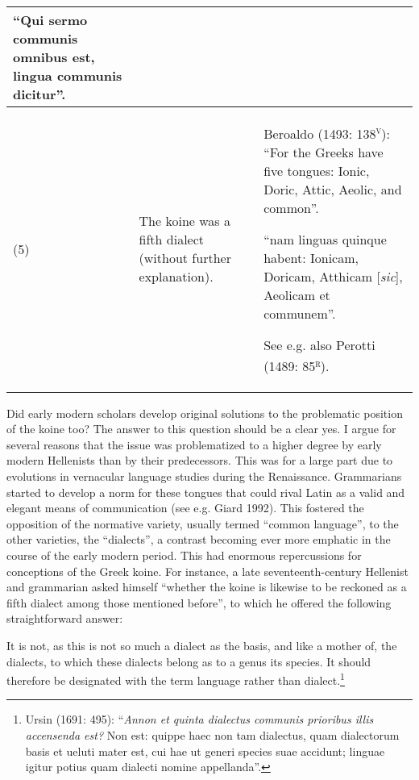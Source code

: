 \begin{flushleft}
\begin{supertabular}{|m{0.27685985in}|m{1.8261598in}|m{3.9538598in}|}
“Qui sermo communis omnibus est, lingua communis dicitur”.\\\hline
\centering (5) &
\centering The koine was a fifth dialect (without further explanation). &
Beroaldo (1493: 138\textsc{\textsuperscript{v}}): “For the Greeks have five tongues: Ionic, Doric, Attic, Aeolic, and common”.

“nam linguas quinque habent: Ionicam, Doricam, Atthicam [\textit{sic}], Aeolicam et communem”.

See e.g. also Perotti (1489: 85\textsc{\textsuperscript{r}}).\\\hline
\end{supertabular}
\end{flushleft}
\begin{styleStandard}
Did early modern scholars develop original solutions to the problematic position of the koine too? The answer to this question should be a clear yes. I argue for several reasons that the issue was problematized to a higher degree by early modern Hellenists than by their predecessors. This was for a large part due to evolutions in vernacular language studies during the Renaissance. Grammarians started to develop a norm for these tongues that could rival Latin as a valid and elegant means of communication (see e.g. Giard 1992). This fostered the opposition of the normative variety, usually termed “common language”, to the other varieties, the “dialects”, a contrast becoming ever more emphatic in the course of the early modern period. This had enormous repercussions for conceptions of the Greek koine. For instance, a late seventeenth-century Hellenist and grammarian asked himself “whether the koine is likewise to be reckoned as a fifth dialect among those mentioned before”, to which he offered the following straightforward answer:
\end{styleStandard}

\begin{styleQuote}
It is not, as this is not so much a dialect as the basis, and like a mother of, the dialects, to which these dialects belong as to a genus its species. It should therefore be designated with the term language rather than dialect.\footnote{ Ursin (1691: 495): “\textit{Annon et quinta dialectus communis prioribus illis accensenda est?} Non est: quippe haec non tam dialectus, quam dialectorum basis et ueluti mater est, cui hae ut generi species suae accidunt; linguae igitur potius quam dialecti nomine appellanda”.}
\end{styleQuote}

